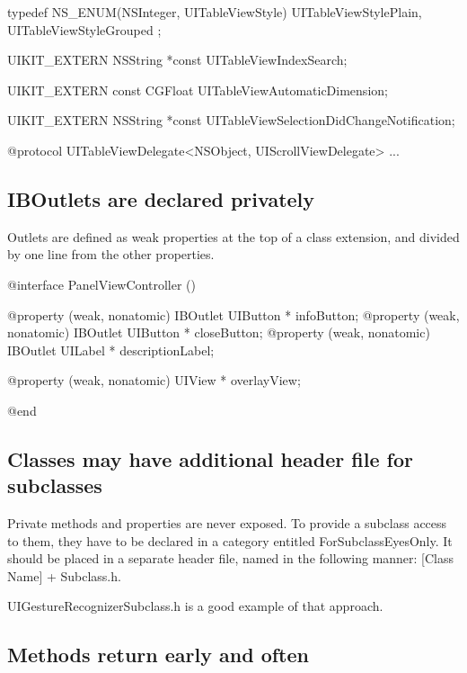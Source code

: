 \documentclass[10pt]{extarticle}
\newenvironment{tiplisting}
{\small\mdframed[middlelinewidth=0.5pt, middlelinecolor=GoldenDreamColor, skipabove=15pt]{\textbf{Tip:}}}
{\endmdframed\vspace{12pt}\normalsize}
\begin{document}
\begin{codelisting}
typedef NS_ENUM(NSInteger, UITableViewStyle) {
    UITableViewStylePlain,
    UITableViewStyleGrouped
};

UIKIT_EXTERN NSString *const UITableViewIndexSearch;

UIKIT_EXTERN const CGFloat UITableViewAutomaticDimension;

UIKIT_EXTERN NSString *const UITableViewSelectionDidChangeNotification;

@protocol UITableViewDelegate<NSObject, UIScrollViewDelegate>
...
\end{codelisting}

\subsection{IBOutlets are declared privately}

Outlets are defined as weak properties at the top of a class extension, and divided by one line from the other properties.

\begin{codelisting}
@interface PanelViewController ()

@property (weak, nonatomic) IBOutlet UIButton * infoButton;
@property (weak, nonatomic) IBOutlet UIButton * closeButton;
@property (weak, nonatomic) IBOutlet UILabel * descriptionLabel;

@property (weak, nonatomic) UIView * overlayView;

@end
\end{codelisting}


\subsection{Classes may have additional header file for subclasses}

Private methods and properties are never exposed. To provide a subclass access to them, they have to be declared in a category entitled ForSubclassEyesOnly. It should be placed in a separate header file, named in the following manner: [Class Name] + Subclass.h. 

\begin{tiplisting}
UIGestureRecognizerSubclass.h is a good example of that approach.
\end{tiplisting}


\subsection{Methods return early and often}
\end{document}
